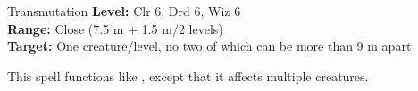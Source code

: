 {Transmutation}
{
	\textbf{Level:}
	Clr 6, Drd 6, Wiz 6\\
	\textbf{Range:}
	Close (7.5 m + 1.5 m/2 levels)\\
	\textbf{Target:}
	One creature/level, no two of which can be more than 9 m apart\\
}
{
	This spell functions like , except that it affects multiple creatures.

}
